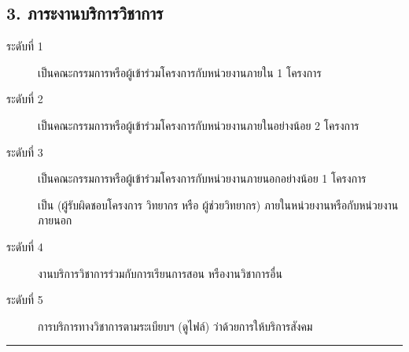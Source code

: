 \documentclass[a4paper,12pt,english]{sphinxmanual}
\begin{document}
\subsection{3. ภาระงานบริการวิชาการ}
\label{\detokenize{submission_part1:id17}}\begin{description}
\item[{ระดับที่ 1}] \leavevmode
เป็นคณะกรรมการหรือผู้เข้าร่วมโครงการกับหน่วยงานภายใน 1 โครงการ

\item[{ระดับที่ 2}] \leavevmode
เป็นคณะกรรมการหรือผู้เข้าร่วมโครงการกับหน่วยงานภายในอย่างน้อย 2 โครงการ

\item[{ระดับที่ 3}] \leavevmode
เป็นคณะกรรมการหรือผู้เข้าร่วมโครงการกับหน่วยงานภายนอกอย่างน้อย 1 โครงการ

 เป็น {\hyperref[\detokenize{glossary:term-5}]{}} (ผู้รับผิดชอบโครงการ วิทยากร หรือ ผู้ช่วยวิทยากร) ภายในหน่วยงานหรือกับหน่วยงานภายนอก

\item[{ระดับที่ 4}] \leavevmode
{\hyperref[\detokenize{glossary:term-11}]{}} งานบริการวิชาการร่วมกับการเรียนการสอน หรืองานวิชาการอื่น

\end{description}
\begin{description}
\item[{ระดับที่ 5}] \leavevmode
การบริการทางวิชาการตามระเบียบฯ (ดูไฟล์) ว่าด้วยการให้บริการสังคม

\end{description}


\bigskip\hrule\bigskip
\end{document}
